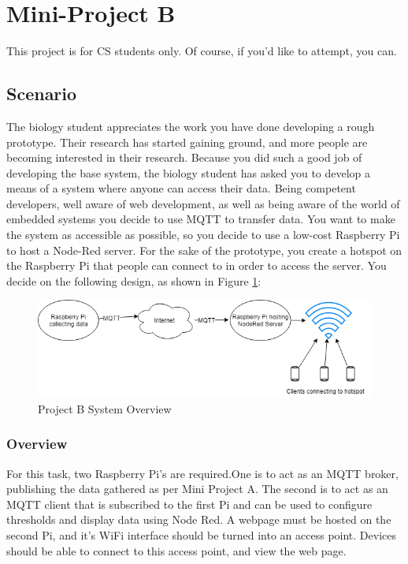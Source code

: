 \section{Mini-Project B}
This project is for CS students only. Of course, if you'd like to attempt, you can.\\

\subsection{Scenario}
The biology student appreciates the work you have done developing a rough prototype. Their research has started gaining ground, and more people are becoming interested in their research. Because you did such a good job of developing the base system, the biology student has asked you to develop a means of a system where anyone can access their data. Being competent developers, well aware of web development, as well as being aware of the world of embedded systems you decide to use MQTT to transfer data. You want to make the system as accessible as possible, so you decide to use a low-cost Raspberry Pi to host a Node-Red server. For the sake of the prototype, you create a hotspot on the Raspberry Pi that people can connect to in order to access the server. You decide on the following design, as shown in Figure \ref{fig:NodeRed}:

\begin{figure}[H]
\centering
\includegraphics[width=0.8\columnwidth]{Figures/NodeRed}
\caption{Project B System Overview}
\label{fig:NodeRed}
\end{figure}

\subsubsection{Overview}
For this task, two Raspberry Pi's are required.One is to act as an MQTT broker, publishing the data gathered as per Mini Project A. The second is to act as an MQTT client that is subscribed to the first Pi and can be used to configure thresholds and display data using Node Red. A webpage must be hosted on the second Pi, and it's WiFi interface should be turned into an access point. Devices should be able to connect to this access point, and view the web page.

